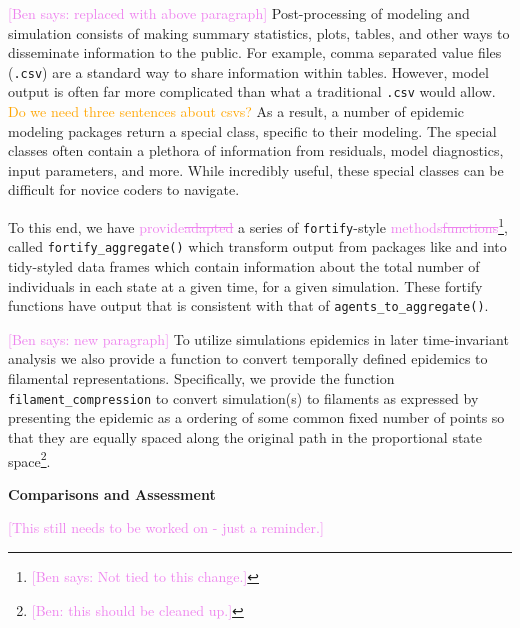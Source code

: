 \documentclass[
  shortnames]{jss}
\begin{document}
\textcolor{violet}{[Ben says: replaced with above paragraph]}
Post-processing of modeling and simulation consists of making summary
statistics, plots, tables, and other ways to disseminate information to
the public. For example, comma separated value files (\texttt{.csv}) are
a standard way to share information within tables. However, model output
is often far more complicated than what a traditional \texttt{.csv}
would allow. \textcolor{orange}{Do we need three sentences about csvs?}
As a result, a number of epidemic modeling packages return a special
class, specific to their modeling. The special classes often contain a
plethora of information from residuals, model diagnostics, input
parameters, and more. While incredibly useful, these special classes can
be difficult for novice coders to navigate.

To this end, we have \textcolor{violet}{provide\sout{adapted}} a series
of \texttt{fortify}-style
\textcolor{violet}{methods\sout{functions}}\footnote{\textcolor{violet}{[Ben says: Not tied to this change.]}},
called \texttt{fortify\_aggregate()} which transform output from
packages like  and  into tidy-styled data frames
which contain information about the total number of individuals in each
state at a given time, for a given simulation. These fortify functions
have output that is consistent with that of
\texttt{agents\_to\_aggregate()}.

\textcolor{violet}{[Ben says: new paragraph]} To utilize simulations
epidemics in later time-invariant analysis we also provide a function to
convert temporally defined epidemics to filamental representations.
Specifically, we provide the function \texttt{filament\_compression} to
convert simulation(s) to filaments as expressed by presenting the
epidemic as a ordering of some common fixed number of points so that
they are equally spaced along the original path in the proportional
state
space\footnote{\textcolor{violet}{[Ben: this should be cleaned up.]}}.

\textbf{Comparisons and Assessment}

\textcolor{violet}{[This still needs to be worked on - just a reminder.]}
\end{document}
